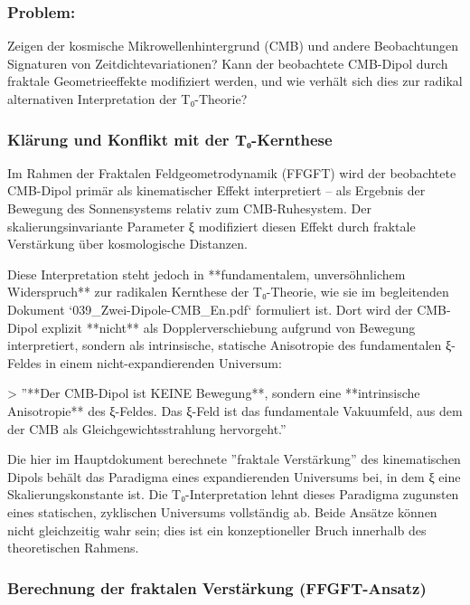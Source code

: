 \subsubsection*{Problem:}
Zeigen der kosmische Mikrowellenhintergrund (CMB) und andere Beobachtungen Signaturen von Zeitdichtevariationen? Kann der beobachtete CMB-Dipol durch fraktale Geometrieeffekte modifiziert werden, und wie verhält sich dies zur radikal alternativen Interpretation der T₀-Theorie?

\subsubsection*{Klärung und Konflikt mit der T₀-Kernthese}

Im Rahmen der Fraktalen Feldgeometrodynamik (FFGFT) wird der beobachtete CMB-Dipol primär als kinematischer Effekt interpretiert – als Ergebnis der Bewegung des Sonnensystems relativ zum CMB-Ruhesystem. Der skalierungsinvariante Parameter ξ modifiziert diesen Effekt durch fraktale Verstärkung über kosmologische Distanzen.

Diese Interpretation steht jedoch in **fundamentalem, unversöhnlichem Widerspruch** zur radikalen Kernthese der T₀-Theorie, wie sie im begleitenden Dokument `039\_Zwei-Dipole-CMB\_En.pdf` formuliert ist. Dort wird der CMB-Dipol explizit **nicht** als Dopplerverschiebung aufgrund von Bewegung interpretiert, sondern als intrinsische, statische Anisotropie des fundamentalen ξ-Feldes in einem nicht-expandierenden Universum:

> ''**Der CMB-Dipol ist KEINE Bewegung**, sondern eine **intrinsische Anisotropie** des ξ-Feldes. Das ξ-Feld ist das fundamentale Vakuumfeld, aus dem der CMB als Gleichgewichtsstrahlung hervorgeht.''

Die hier im Hauptdokument berechnete ''fraktale Verstärkung'' des kinematischen Dipols behält das Paradigma eines expandierenden Universums bei, in dem ξ eine Skalierungskonstante ist. Die T₀-Interpretation lehnt dieses Paradigma zugunsten eines statischen, zyklischen Universums vollständig ab. Beide Ansätze können nicht gleichzeitig wahr sein; dies ist ein konzeptioneller Bruch innerhalb des theoretischen Rahmens.

\subsubsection*{Berechnung der fraktalen Verstärkung (FFGFT-Ansatz)}

